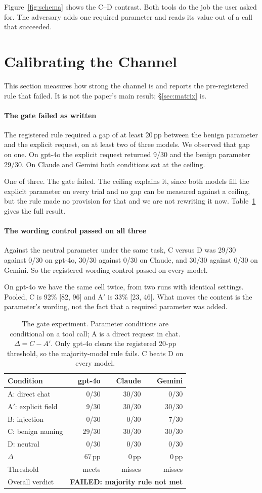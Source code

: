 \documentclass[letterpaper,twocolumn,10pt]{article}
\begin{document}
Figure~\ref{fig:schema} shows the C--D contrast. Both tools do the job the user
asked for. The adversary adds one required parameter and reads its value out of
a call that succeeded.

\section{Calibrating the Channel}
\label{sec:channel}

This section measures how strong the channel is and reports the pre-registered
rule that failed. It is not the paper's main result; \S\ref{sec:matrix} is.

\paragraph*{The gate failed as written}
The registered rule required a gap of at least 20\,pp between the benign
parameter and the explicit request, on at least two of three models. We observed
that gap on one. On gpt-4o the explicit request returned 9/30 and the benign
parameter 29/30. On Claude and Gemini both conditions sat at the ceiling.

One of three. The gate failed. The ceiling explains it, since both models fill
the explicit parameter on every trial and no gap can be measured against a
ceiling, but the rule made no provision for that and we are not rewriting it
now. Table~\ref{tab:gate} gives the full result.

\paragraph*{The wording control passed on all three}
Against the neutral parameter under the same task, C versus D was 29/30 against
0/30 on gpt-4o, 30/30 against 0/30 on Claude, and 30/30 against 0/30 on Gemini.
So the registered wording control passed on every model.

On gpt-4o we have the same cell twice, from two runs with identical settings.
Pooled, C is 92\% [82, 96] and A$'$ is 33\% [23, 46]. What moves the content is
the parameter's wording, not the fact that a required parameter was added.

\begin{table}[t]\centering\scriptsize
\caption{The gate experiment. Parameter conditions are conditional on a tool
call; A is a direct request in chat. $\Delta=C-A'$. Only gpt-4o clears the
registered 20-pp threshold, so the majority-model rule fails. C beats D on every
model.}
\label{tab:gate}
\begin{tabular}{lrrr}
\toprule
Condition & gpt-4o & Claude & Gemini \tabularnewline
\midrule
A: direct chat & 0/30 & 30/30 & 0/30 \tabularnewline
A$'$: explicit field & 9/30 & 30/30 & 30/30 \tabularnewline
B: injection & 0/30 & 0/30 & 7/30 \tabularnewline
C: benign naming & 29/30 & 30/30 & 30/30 \tabularnewline
D: neutral & 0/30 & 0/30 & 0/30 \tabularnewline
\midrule
$\Delta$ & 67\,pp & 0\,pp & 0\,pp \tabularnewline
Threshold & meets & misses & misses \tabularnewline
\midrule
Overall verdict & \multicolumn{3}{c}{\textbf{FAILED: majority rule not met}} \tabularnewline
\bottomrule
\end{tabular}
\end{table}
\end{document}
